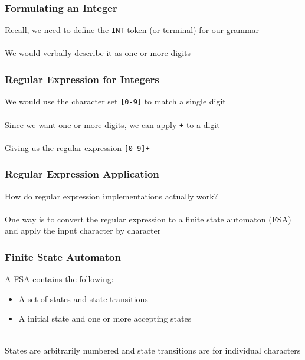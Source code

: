 \documentclass[aspectratio=169]{beamer}
\begin{document}
\begin{frame}
\frametitle{Formulating an Integer}

Recall, we need to define the \lstinline{INT} \alert{token} (or
\alert{terminal}) for our grammar\\~\\

We would verbally describe it as one or more digits
\end{frame}

\begin{frame}
\frametitle{Regular Expression for Integers}

We would use the character set \lstinline{[0-9]} to match a single digit\\~\\

Since we want one or more digits, we can apply \lstinline{+} to a digit\\~\\

Giving us the regular expression \lstinline{[0-9]+}
\end{frame}

\begin{frame}
\frametitle{Regular Expression Application}

How do regular expression implementations actually work?\\~\\

One way is to convert the regular expression to a \alert{finite state automaton}
(FSA) and apply the input character by character
\end{frame}

\begin{frame}
\frametitle{Finite State Automaton}

A FSA contains the following:
\begin{itemize}
  \item A set of \alert{states} and \alert{state transitions}
  \item A \alert{initial state} and one or more \alert{accepting states}\\~\\
\end{itemize}

\alert{States} are arbitrarily numbered and \alert{state transitions} are for
individual characters
\end{frame}
\end{document}
